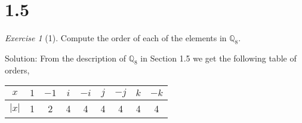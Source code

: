 \documentclass[12pt]{amsart}
\makeatletter
\theoremstyle{remark}
\newtheorem*{exercise}{Exercise}%
\renewenvironment{proof}[1][\proofname]{\par\doublespacing
  \pushQED{\qed}%
  \normalfont \topsep6\p@\@plus6\p@\relax
  \list{}{%
    \settowidth{\leftmargin}{\itshape\proofname:\hskip\labelsep}%
    \setlength{\labelwidth}{0pt}%
    \setlength{\itemindent}{-\leftmargin}%
  }%
  \item[\hskip\labelsep\itshape#1\@addpunct{:}]\ignorespaces
}{%
  \popQED\endlist\@endpefalse
  \singlespacing
}
\theoremstyle{mycomment}
\makeatother
\begin{document}
\section*{1.5}
\begin{exercise}[1] Compute the order of each of the elements in $\mathbb{Q}_8$.
  \begin{proof}{Solution:} From the description of $\mathbb{Q}_8$ in Section 1.5 we get the following table of orders, 
    \begin{center}
      \begin{tabular}{c | c c c c c c c c} 
        $x$ & $1$ & $-1$ & $i$ & $-i$ & $j$ & $-j$ & $k$ & $-k$\\ 
        \hline
        $|x|$ & 1 & 2 & 4 & 4 & 4 & 4 & 4 & 4
      \end{tabular}
      \end{center}
    
  \end{proof} 
  
\end{exercise}
\end{document}

